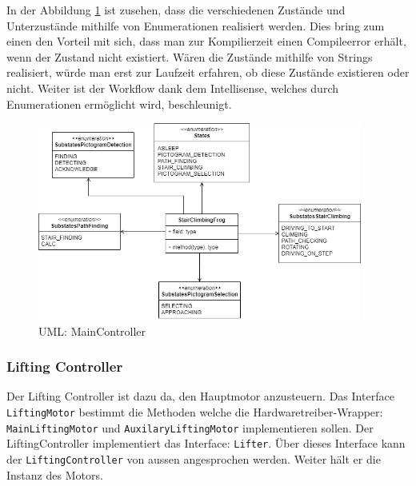 In der Abbildung \ref{fig:uml-main} ist zusehen, dass die verschiedenen Zustände und Unterzustände mithilfe von Enumerationen realisiert werden. Dies bring zum einen den Vorteil mit sich, dass man zur Kompilierzeit einen Compileerror erhält, wenn der Zustand nicht existiert. Wären die Zustände mithilfe von Strings realisiert, würde man erst zur Laufzeit erfahren, ob diese Zustände existieren oder nicht. Weiter ist der Workflow dank dem Intellisense, welches durch Enumerationen ermöglicht wird, beschleunigt.

\begin{figure}[H]
  \includegraphics[width=0.95\textwidth]{img/softwarearchitektur/UML-MainController.png}
  \centering
  \caption{UML: MainController}
  \label{fig:uml-main}
\end{figure}


\subsubsection{Lifting Controller}
Der Lifting Controller ist dazu da, den Hauptmotor anzusteuern.
Das Interface \texttt{LiftingMotor} bestimmt die Methoden welche die Hardwaretreiber-Wrapper: \texttt{MainLiftingMotor} und \texttt{AuxilaryLiftingMotor} implementieren sollen. Der LiftingController implementiert das Interface: \texttt{Lifter}. Über dieses Interface kann der \texttt{LiftingController} von aussen angesprochen werden. Weiter hält er die Instanz des Motors.

